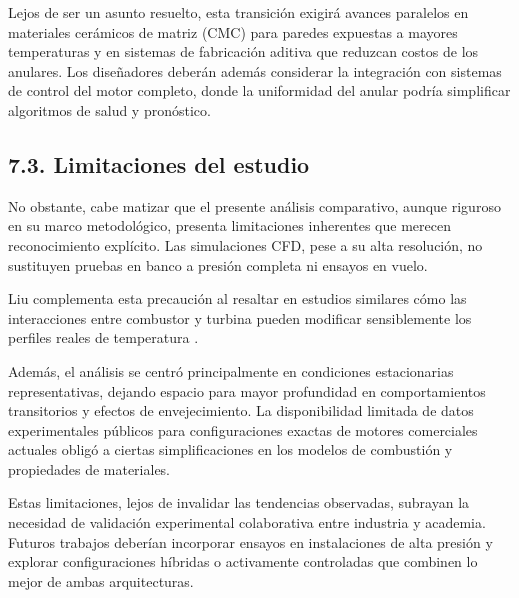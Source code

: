 Lejos de ser un asunto resuelto, esta transición exigirá avances paralelos en materiales cerámicos de matriz (CMC) para paredes expuestas a mayores temperaturas y en sistemas de fabricación aditiva que reduzcan costos de los anulares. Los diseñadores deberán además considerar la integración con sistemas de control del motor completo, donde la uniformidad del anular podría simplificar algoritmos de salud y pronóstico.

\subsection{7.3. Limitaciones del estudio}

No obstante, cabe matizar que el presente análisis comparativo, aunque riguroso en su marco metodológico, presenta limitaciones inherentes que merecen reconocimiento explícito. Las simulaciones CFD, pese a su alta resolución, no sustituyen pruebas en banco a presión completa ni ensayos en vuelo. 

Liu complementa esta precaución al resaltar en estudios similares cómo las interacciones entre combustor y turbina pueden modificar sensiblemente los perfiles reales de temperatura \cite{Liu2024}. 

Además, el análisis se centró principalmente en condiciones estacionarias representativas, dejando espacio para mayor profundidad en comportamientos transitorios y efectos de envejecimiento. La disponibilidad limitada de datos experimentales públicos para configuraciones exactas de motores comerciales actuales obligó a ciertas simplificaciones en los modelos de combustión y propiedades de materiales.

Estas limitaciones, lejos de invalidar las tendencias observadas, subrayan la necesidad de validación experimental colaborativa entre industria y academia. Futuros trabajos deberían incorporar ensayos en instalaciones de alta presión y explorar configuraciones híbridas o activamente controladas que combinen lo mejor de ambas arquitecturas.